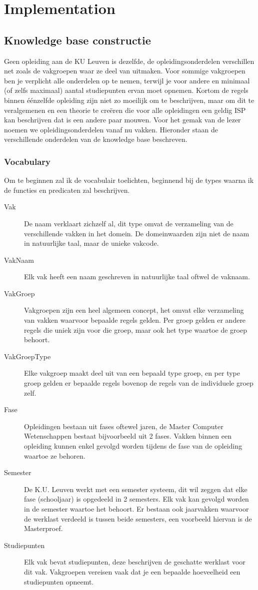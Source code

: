 \chapter{Implementation}
\label{cha:implementation}

\section{Knowledge base constructie}
Geen opleiding aan de KU Leuven is dezelfde, de opleidingsonderdelen verschillen net zoals de vakgroepen waar ze deel van uitmaken. Voor sommige vakgroepen ben je verplicht alle onderdelen op te nemen, terwijl je voor andere en minimaal (of zelfs maximaal) aantal studiepunten ervan moet opnemen. Kortom de regels binnen \'{e}\'{e}nzelfde opleiding zijn niet zo moeilijk om te beschrijven, maar om dit te veralgemenen en een theorie te cre\"{e}ren die voor alle opleidingen een geldig ISP kan beschrijven dat is een andere paar mouwen. Voor het gemak van de lezer noemen we opleidingsonderdelen vanaf nu vakken. Hieronder staan de verschillende onderdelen van de knowledge base beschreven.

\subsection{Vocabulary}
Om te beginnen zal ik de vocabulair toelichten, beginnend bij de types waarna ik de functies en predicaten zal beschrijven.
\begin{description}
\item [Vak] De naam verklaart zichzelf al, dit type omvat de verzameling van de verschillende vakken in het domein. 
De domeinwaarden zijn niet de naam in natuurlijke taal, maar de unieke vakcode.
\item [VakNaam] Elk vak heeft een naam geschreven in natuurlijke taal oftwel de vaknaam.
\item [VakGroep] Vakgroepen zijn een heel algemeen concept, het omvat elke verzameling van vakken waarvoor bepaalde regels gelden. Per groep gelden er andere regels die uniek zijn voor die groep, maar ook het type waartoe de groep behoort.
\item [VakGroepType] Elke vakgroep maakt deel uit van een bepaald type groep, en per type groep gelden er bepaalde regels bovenop de regels van de individuele groep zelf.
\item [Fase] Opleidingen bestaan uit fases oftewel jaren, de Master Computer Wetenschappen bestaat bijvoorbeeld uit 2 fases. Vakken binnen een opleiding kunnen enkel gevolgd worden tijdens de fase van de opleiding waartoe ze behoren. 
\item [Semester] De K.U. Leuven werkt met een semester systeem, dit wil zeggen dat elke fase (schooljaar) is opgedeeld in 2 semesters. Elk vak kan gevolgd worden in de semester waartoe het behoort. Er bestaan ook jaarvakken waarvoor de werklast verdeeld is tussen beide semesters, een voorbeeld hiervan is de Masterproef.
\item [Studiepunten] Elk vak bevat studiepunten, deze beschrijven de geschatte werklast voor dit vak. Vakgroepen vereisen vaak dat je een bepaalde hoeveelheid een studiepunten opneemt. 
\end{description}

